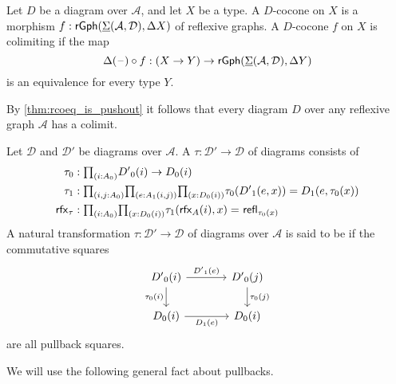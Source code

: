\begin{defn}
Let $D$ be a diagram over $\mathcal{A}$, and let $X$ be a type. A $D$-cocone on $X$ is a morphism $f:\mathsf{rGph}(\underline{\Sigma}(\mathcal{A},\mathcal{D}),\Delta X)$ of reflexive graphs. A $D$-cocone $f$ on $X$ is colimiting if the map
\begin{equation*}
\Delta(\mathord{\hspace{1pt}\text{--}\hspace{1pt}})\circ f : (X\to Y)\to \mathsf{rGph}(\underline{\Sigma}(\mathcal{A},\mathcal{D}),\Delta Y)
\end{equation*}
is an equivalence for every type $Y$. 
\end{defn}

\begin{rmk}
By \cref{thm:rcoeq_is_pushout} it follows that every diagram $D$ over any reflexive graph $\mathcal{A}$ has a colimit. 
\end{rmk}

\begin{defn}
Let $\mathcal{D}$ and $\mathcal{D}'$ be diagrams over $\mathcal{A}$. A  $\tau : \mathcal{D}'\to \mathcal{D}$ of diagrams consists of
\begin{align*}
\pts{\tau} & : \prd{i:\pts{A}}\pts{D'}(i)\to\pts{D}(i) \\
\edg{\tau} & : \prd*{i,j:\pts{A}}{e:\edg{A}(i,j)}\prd{x:\pts{D}(i)}\pts{\tau}(\edg{D'}(e,x))=\edg{D}(e,\pts{\tau}(x)) \\
\rfx{\tau} & : \prd{i:\pts{A}}{x:\pts{D}(i)} \dpath{}{}{\edg{\tau}(\rfx{A}(i),x)}{\refl{\pts{\tau}(x)}}
\end{align*}
A natural transformation $\tau:\mathcal{D}'\to \mathcal{D}$ of diagrams over $\mathcal{A}$ is said to be  if the commutative squares
\begin{equation*}
\begin{tikzcd}[column sep=large]
\pts{D'}(i) \arrow[r,"{\edg{D'}(e)}"] \arrow[d,swap,"\pts{\tau}(i)"] & \pts{D'}(j) \arrow[d,"\pts{\tau}(j)"] \\
\pts{D}(i) \arrow[r,swap,"{\edg{D}(e)}"] & \pts{D}(i)
\end{tikzcd}
\end{equation*}
are all pullback squares. 
\end{defn}

We will use the following general fact about pullbacks.

